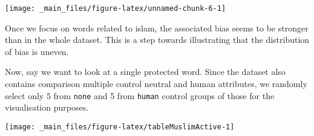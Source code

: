 \documentclass[]{book}
\newenvironment{Shaded}{\begin{snugshade}}{\end{snugshade}}
\newcommand{\KeywordTok}[1]{\textcolor[rgb]{0.13,0.29,0.53}{\textbf{#1}}}
\newcommand{\DecValTok}[1]{\textcolor[rgb]{0.00,0.00,0.81}{#1}}
\newcommand{\StringTok}[1]{\textcolor[rgb]{0.31,0.60,0.02}{#1}}
\newcommand{\CommentTok}[1]{\textcolor[rgb]{0.56,0.35,0.01}{\textit{#1}}}
\newcommand{\OperatorTok}[1]{\textcolor[rgb]{0.81,0.36,0.00}{\textbf{#1}}}
\newcommand{\NormalTok}[1]{#1}
\begin{document}
\begin{center}\texttt{[image: \_main\_files/figure-latex/unnamed-chunk-6-1]} \end{center}

\normalsize

\noindent Once we focus on words related to islam, the associated bias
seems to be stronger than in the whole dataset. This is a step towards
illustrating that the distribution of bias is uneven.

Now, say we want to look at a single protected word. Since the dataset
also contains comparison multiple control neutral and human attributes,
we randomly select only 5 from \texttt{none} and 5 from \texttt{human}
control groups of those for the visualisation purposes.

\vspace{1mm} \footnotesize

\begin{Shaded}
\end{Shaded}

\begin{center}\texttt{[image: \_main\_files/figure-latex/tableMuslimActive-1]} \end{center}
\end{document}
